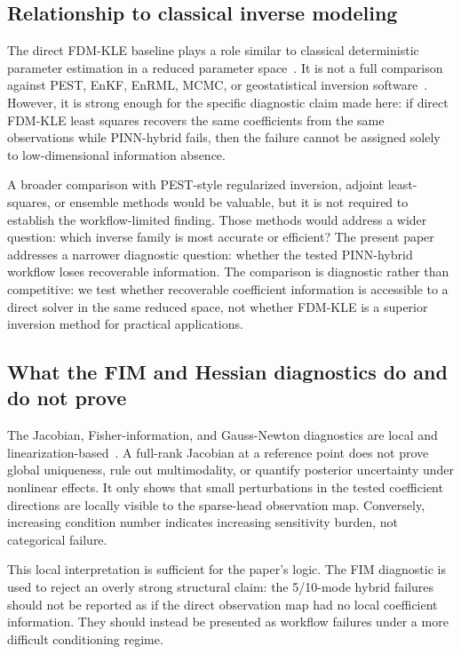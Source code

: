 \documentclass[pdflatex,sn-mathphys,Numbered,iicol]{sn-jnl}
\begin{document}
\subsection{Relationship to classical inverse modeling}
\label{sec:disc-classical}

The direct FDM-KLE baseline plays a role similar to classical deterministic
parameter estimation in a reduced parameter
space~\cite{doherty2015pest, zhou2014inverse, hill2007effective}. It is not a
full comparison against PEST, EnKF, EnRML, MCMC, or geostatistical inversion
software~\cite{evensen2003enkf, oliver2008inverse, white2018model}.
However, it is strong enough for the specific diagnostic claim made here: if
direct FDM-KLE least squares recovers the same coefficients from the same
observations while PINN-hybrid fails, then the failure cannot be assigned
solely to low-dimensional information absence.

A broader comparison with PEST-style regularized inversion, adjoint
least-squares, or ensemble methods would be valuable, but it is not required
to establish the workflow-limited finding. Those methods would address a wider
question: which inverse family is most accurate or efficient? The present
paper addresses a narrower diagnostic question: whether the tested PINN-hybrid
workflow loses recoverable information. The comparison is diagnostic rather than
competitive: we test whether recoverable coefficient information is accessible
to a direct solver in the same reduced space, not whether FDM-KLE is a superior
inversion method for practical applications.

\subsection{What the FIM and Hessian diagnostics do and do not prove}
\label{sec:disc-fim}

The Jacobian, Fisher-information, and Gauss-Newton diagnostics are local and
linearization-based~\cite{tarantola2005inverse, aster2018parameter}. A full-rank Jacobian
at a reference point does not prove global uniqueness, rule out multimodality,
or quantify posterior uncertainty under nonlinear effects. It only shows that
small perturbations in the tested coefficient directions are locally visible to
the sparse-head observation map. Conversely, increasing condition number
indicates increasing sensitivity burden, not categorical failure.

This local interpretation is sufficient for the paper's logic. The FIM
diagnostic is used to reject an overly strong structural claim: the 5/10-mode
hybrid failures should not be reported as if the direct observation map had no
local coefficient information. They should instead be presented as workflow
failures under a more difficult conditioning regime.
\end{document}
